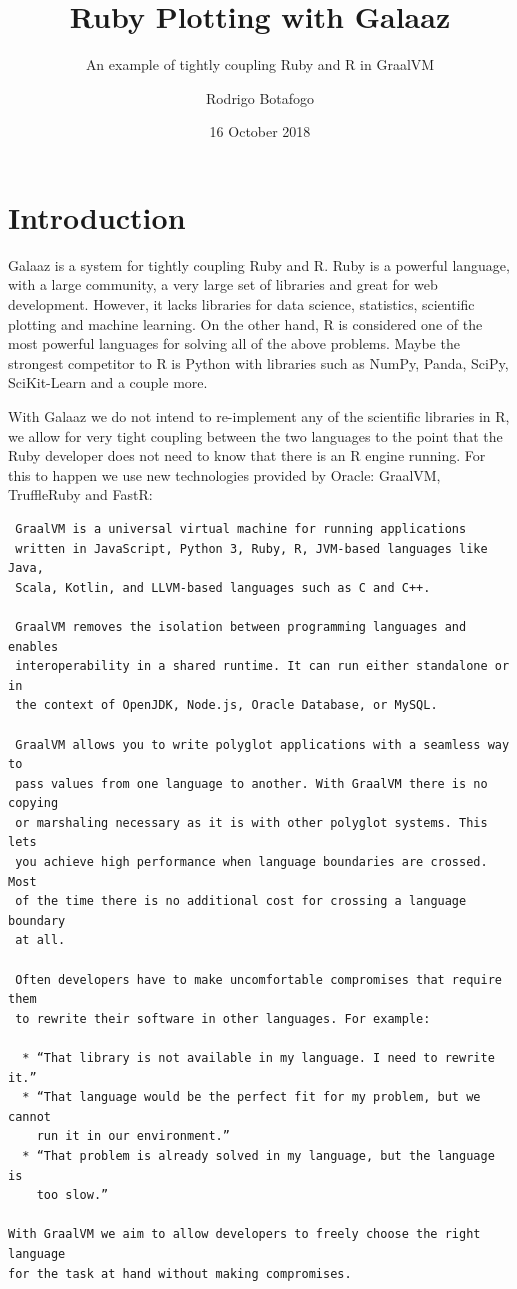\documentclass[11pt,]{article}
\title{Ruby Plotting with Galaaz}
\subtitle{An example of tightly coupling Ruby and R in GraalVM}
\author{Rodrigo Botafogo}
\date{16 October 2018}
\begin{document}
\maketitle

{
\setcounter{tocdepth}{2}
\tableofcontents
}
\section{Introduction}\label{introduction}

Galaaz is a system for tightly coupling Ruby and R. Ruby is a powerful
language, with a large community, a very large set of libraries and
great for web development. However, it lacks libraries for data science,
statistics, scientific plotting and machine learning. On the other hand,
R is considered one of the most powerful languages for solving all of
the above problems. Maybe the strongest competitor to R is Python with
libraries such as NumPy, Panda, SciPy, SciKit-Learn and a couple more.

With Galaaz we do not intend to re-implement any of the scientific
libraries in R, we allow for very tight coupling between the two
languages to the point that the Ruby developer does not need to know
that there is an R engine running. For this to happen we use new
technologies provided by Oracle: GraalVM, TruffleRuby and FastR:

\begin{verbatim}
 GraalVM is a universal virtual machine for running applications
 written in JavaScript, Python 3, Ruby, R, JVM-based languages like Java,
 Scala, Kotlin, and LLVM-based languages such as C and C++.

 GraalVM removes the isolation between programming languages and enables
 interoperability in a shared runtime. It can run either standalone or in
 the context of OpenJDK, Node.js, Oracle Database, or MySQL.

 GraalVM allows you to write polyglot applications with a seamless way to
 pass values from one language to another. With GraalVM there is no copying
 or marshaling necessary as it is with other polyglot systems. This lets
 you achieve high performance when language boundaries are crossed. Most
 of the time there is no additional cost for crossing a language boundary
 at all.

 Often developers have to make uncomfortable compromises that require them
 to rewrite their software in other languages. For example:

  * “That library is not available in my language. I need to rewrite it.” 
  * “That language would be the perfect fit for my problem, but we cannot
    run it in our environment.” 
  * “That problem is already solved in my language, but the language is
    too slow.”

With GraalVM we aim to allow developers to freely choose the right language
for the task at hand without making compromises.
\end{verbatim}
\end{document}
